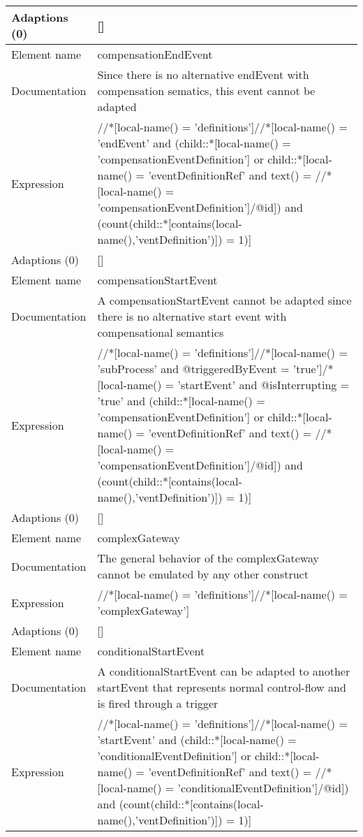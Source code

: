 \begin{center}
\begin{tiny}
\begin{longtable}{p{}|p{}}
\myrowcolour
Adaptions (0) & []\\
\midrule
Element name & compensationEndEvent\\
\myrowcolour
Documentation &Since there is no alternative endEvent with compensation sematics, this event cannot be adapted\\
Expression & //*[local-name() = 'definitions']//*[local-name() = 'endEvent' and (child::*[local-name() = 'compensationEventDefinition'] or child::*[local-name() = 'eventDefinitionRef' and text() = //*[local-name() = 'compensationEventDefinition']/@id]) and (count(child::*[contains(local-name(),'ventDefinition')]) = 1)]\\
\myrowcolour
Adaptions (0) & []\\
\midrule
Element name & compensationStartEvent\\
\myrowcolour
Documentation &A compensationStartEvent cannot be adapted since there is no alternative start event with compensational semantics\\
Expression & //*[local-name() = 'definitions']//*[local-name() = 'subProcess' and @triggeredByEvent = 'true']/*[local-name() = 'startEvent' and @isInterrupting = 'true' and (child::*[local-name() = 'compensationEventDefinition'] or child::*[local-name() = 'eventDefinitionRef' and text() = //*[local-name() = 'compensationEventDefinition']/@id]) and (count(child::*[contains(local-name(),'ventDefinition')]) = 1)]\\
\myrowcolour
Adaptions (0) & []\\
\midrule
Element name & complexGateway\\
\myrowcolour
Documentation &The general behavior of the complexGateway cannot be emulated by any other construct\\
Expression & //*[local-name() = 'definitions']//*[local-name() = 'complexGateway']\\
\myrowcolour
Adaptions (0) & []\\
\midrule
Element name & conditionalStartEvent\\
\myrowcolour
Documentation &A conditionalStartEvent can be adapted to another startEvent that represents normal control-flow and is fired through a trigger\\
Expression & //*[local-name() = 'definitions']//*[local-name() = 'startEvent' and (child::*[local-name() = 'conditionalEventDefinition'] or child::*[local-name() = 'eventDefinitionRef' and text() = //*[local-name() = 'conditionalEventDefinition']/@id]) and (count(child::*[contains(local-name(),'ventDefinition')]) = 1)]\\

\end{longtable}
\end{tiny}
\end{center}
